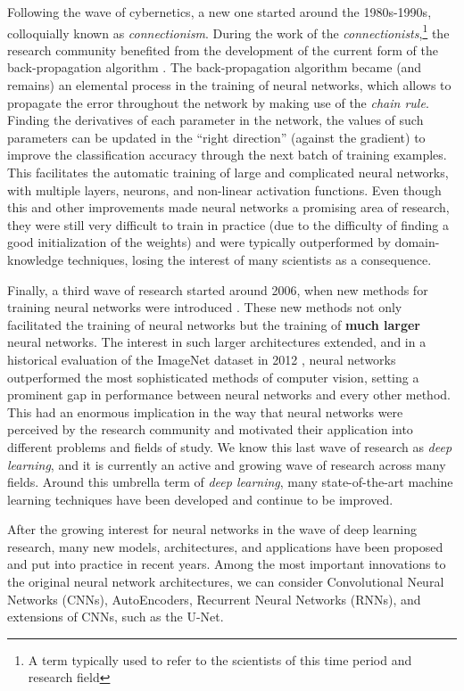 Following the wave of cybernetics, a new one started around
the 1980s-1990s, colloquially known as \emph{connectionism}.
During the work of the \emph{connectionists},\footnote{A
term typically used to refer to the scientists of this time
period and research field} the research community benefited
from the development of the current form of the
back-propagation algorithm
\parencite{rumelhart1988learning}. The back-propagation
algorithm became (and remains) an elemental process in the
training of neural networks, which allows to propagate the
error throughout the network by making use of the
\emph{chain rule}. Finding the derivatives of each parameter
in the network, the values of such parameters can be updated
in the ``right direction'' (against the gradient) to improve
the classification accuracy through the next batch of
training examples. This facilitates the automatic training
of large and complicated neural networks, with multiple
layers, neurons, and non-linear activation functions. Even
though this and other improvements made neural networks a
promising area of research, they were still very difficult
to train in practice (due to the difficulty of finding a
good initialization of the weights) and were typically
outperformed by domain-knowledge techniques, losing the
interest of many scientists as a consequence.

Finally, a third wave of research started around 2006, when
new methods for training neural networks were introduced
\parencite{hinton2006fast}. These new methods not only
facilitated the training of neural networks but the training
of \textbf{much larger} neural networks. The interest in
such larger architectures extended, and in a historical
evaluation of the ImageNet dataset in 2012
\parencite{krizhevsky2012imagenet}, neural networks
outperformed the most sophisticated methods of computer
vision, setting a prominent gap in performance between
neural networks and every other method. This had an enormous
implication in the way that neural networks were perceived
by the research community and motivated their application
into different problems and fields of study. We know this
last wave of research as \emph{deep learning}, and it is
currently an active and growing wave of research across many
fields. Around this umbrella term of \emph{deep learning},
many state-of-the-art machine learning techniques have been
developed and continue to be improved.

After the growing interest for neural networks in the wave
of deep learning research, many new models, architectures,
and applications have been proposed and put into practice in
recent years.
Among the most important innovations to the original neural
network architectures, we can consider Convolutional Neural
Networks (CNNs), AutoEncoders, Recurrent Neural Networks
(RNNs), and extensions of CNNs, such as the U-Net.

